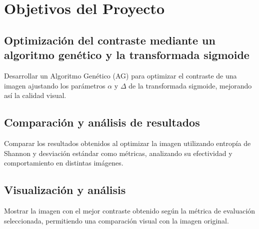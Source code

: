 \chapter{Objetivos del Proyecto}

\section{Optimización del contraste mediante un algoritmo genético y la transformada sigmoide}
Desarrollar un Algoritmo Genético (AG) para optimizar el contraste de una imagen ajustando los parámetros $\alpha$ y $\Delta$ de la transformada sigmoide, mejorando así la calidad visual.

\section{Comparación y análisis de resultados}
Comparar los resultados obtenidos al optimizar la imagen utilizando entropía de Shannon y desviación estándar como métricas, analizando su efectividad y comportamiento en distintas imágenes.

\section{Visualización y análisis}
Mostrar la imagen con el mejor contraste obtenido según la métrica de evaluación seleccionada, permitiendo una comparación visual con la imagen original.
